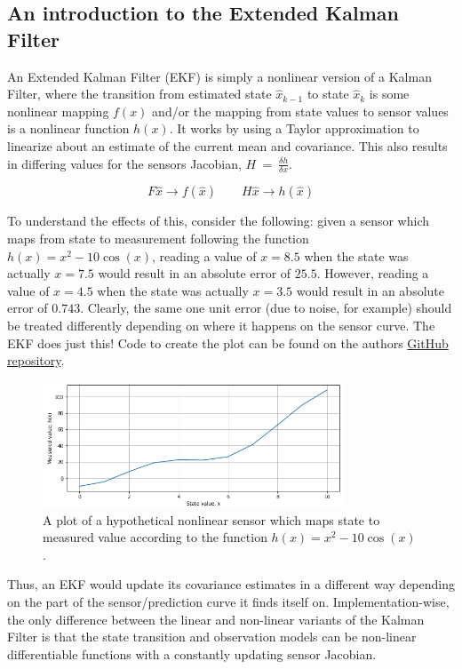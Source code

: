 \subsection{An introduction to the Extended Kalman Filter}
An Extended Kalman Filter (EKF) is simply a nonlinear version of a Kalman Filter, where the transition from estimated state $\hat{x}_{k-1}$ to state $\hat{x}_k$ is some nonlinear mapping $f(x)$ and/or the mapping from state values to sensor values is a nonlinear function $h(x)$. It works by using a Taylor approximation to linearize about an estimate of the current mean and covariance. This also results in differing values for the sensors Jacobian, $H~=~\frac{\delta h}{\delta x}$.

\[ F \hat{x} \rightarrow f(\hat{x}) \qquad H \hat{x} \rightarrow h(\hat{x}) \]

To understand the effects of this, consider the following: given a sensor which maps from state to measurement following the function $h(x) = x^2 - 10\cos{(x)}$, reading a value of $x = 8.5$ when the state was actually $x=7.5$ would result in an absolute error of $25.5$. However, reading a value of $x=4.5$ when the state was actually $x=3.5$ would result in an absolute error of $0.743$. Clearly, the same one unit error (due to noise, for example) should be treated differently depending on where it happens on the sensor curve. The EKF does just this! Code to create the plot can be found on the authors \href{https://github.com/alknemeyer/EEE4022S-Thesis-Project/blob/master/Final%20code/Illustrations%20for%20report.ipynb}{GitHub repository}.

\begin{figure}[h!]
  \centering
  \includegraphics[width=0.8\textwidth]{literature_review/EKF_nonlinear_sensor}
  \caption{\label{fig:EKF_nonlinear_sensor}A plot of a hypothetical nonlinear sensor which maps state to measured value according to the function $h(x) = x^2 - 10\cos{(x)}$.}
\end{figure}

Thus, an EKF would update its covariance estimates in a different way depending on the part of the sensor/prediction curve it finds itself on. Implementation-wise, the only difference between the linear and non-linear variants of the Kalman Filter is that the state transition and observation models can be non-linear differentiable functions with a constantly updating sensor Jacobian.

